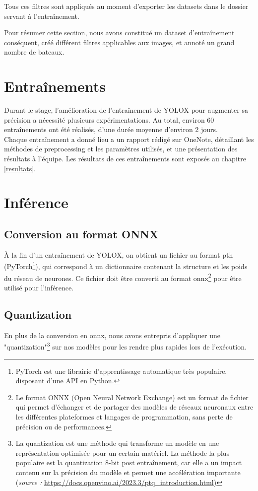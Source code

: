 Tous ces filtres sont appliqués au moment d'exporter les datasets dans le dossier
servant à l'entraînement.

Pour résumer cette section, nous avons constitué un dataset d'entraînement conséquent, créé différent filtres applicables aux images, et annoté un grand nombre de bateaux.

\section{Entraînements}

Durant le stage, l'amélioration de l'entraînement de YOLOX pour augmenter sa précision
a nécessité plusieurs expérimentations. Au total, environ 60 entraînements ont été réalisés,
d'une durée moyenne d'environ 2 jours. \\

Chaque entraînement a donné lieu a un rapport rédigé sur OneNote, détaillant les méthodes de preprocessing et les paramètres utilisés, et une présentation des
résultats à l'équipe. Les résultats de ces entraînements sont exposés au chapitre \ref{resultats}.

\section{Inférence}

\subsection{Conversion au format ONNX}

À la fin d'un entraînement de YOLOX, on obtient un fichier au format pth (PyTorch\footnote{PyTorch est une librairie d'apprentissage automatique très populaire, disposant d'une API en Python.}),
qui correspond à un dictionnaire contenant la structure et les poids du réseau de neurones.
Ce fichier doit être converti au format onnx\footnote{
Le format ONNX (Open Neural Network Exchange) est un format de fichier qui permet d'échanger
et de partager des modèles de réseaux neuronaux entre les différentes plateformes et
langages de programmation, sans perte de précision ou de performances.}
pour être utilisé pour l'inférence.\\

\subsection{Quantization}

En plus de la conversion en onnx, nous avons entrepris d'appliquer une
"quantization"\footnote{La quantization est une méthode qui transforme un modèle en une représentation
optimisée pour un certain matériel. La méthode la plus populaire est la quantization
8-bit post entraînement, car elle a un impact contenu sur la précision du modèle
et permet une accélération importante (\textit{source : }
\url{https://docs.openvino.ai/2023.3/ptq_introduction.html})}
sur nos modèles pour les rendre plus rapides lors de l'exécution.\\

